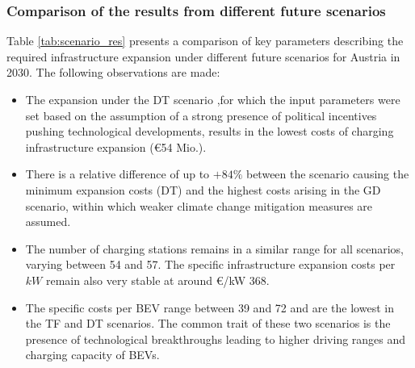 \documentclass[journal,article,submit,pdftex,moreauthors]{Definitions/mdpi}
\begin{document}

\subsubsection{Comparison of the results  from different future scenarios}



Table \ref{tab:scenario_res} presents a comparison of key parameters describing the required infrastructure expansion under different future scenarios for Austria in 2030. The following observations are made:
\begin{itemize}
    \item The expansion under the DT scenario ,for which the input parameters were set based on the assumption of a strong presence of political incentives pushing technological developments, results in the lowest costs of charging infrastructure expansion (€54 Mio.). 
    
    \item There is a relative difference of up to $+84\%$ between the scenario causing the minimum expansion costs (DT) and the highest costs arising in the GD scenario, within which weaker climate change mitigation measures are assumed.
    
    \item The number of charging stations remains in a similar range for all scenarios, varying between 54 and 57. The specific infrastructure expansion costs per $kW$ remain also very stable at around €/kW 368.
    
    \item The specific costs per BEV range between 39 and 72 and are the lowest in the TF and DT scenarios. The common trait of these two scenarios is the presence of technological breakthroughs leading to higher driving ranges and charging capacity of BEVs. 
\end{itemize}
\end{document}
